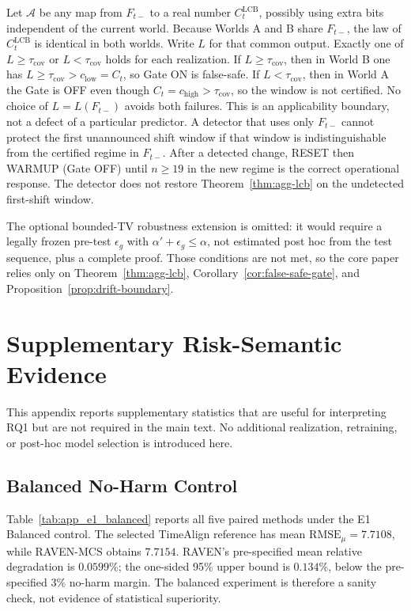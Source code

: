 Let $\mathcal{A}$ be any map from $F_{t-}$ to a real number
$C^{\mathrm{LCB}}_t$, possibly using extra bits independent of the current
world.  Because Worlds A and B share $F_{t-}$, the law of
$C^{\mathrm{LCB}}_t$ is identical in both worlds.  Write $L$ for that common
output.  Exactly one of $L\ge\tau_{\mathrm{cov}}$ or $L<\tau_{\mathrm{cov}}$
holds for each realization.  If $L\ge\tau_{\mathrm{cov}}$, then in World B one
has $L\ge\tau_{\mathrm{cov}}>c_{\mathrm{low}}=C_t$, so Gate ON is false-safe.
If $L<\tau_{\mathrm{cov}}$, then in World A the Gate is OFF even though
$C_t=c_{\mathrm{high}}>\tau_{\mathrm{cov}}$, so the window is not certified.
No choice of $L=L(F_{t-})$ avoids both failures.  This is an applicability
boundary, not a defect of a particular predictor.  A detector that uses only
$F_{t-}$ cannot protect the first unannounced shift window if that window is
indistinguishable from the certified regime in $F_{t-}$.  After a detected
change, RESET then WARMUP (Gate OFF) until $n\ge 19$ in the new regime is the
correct operational response.  The detector does not restore
Theorem~\ref{thm:agg-lcb} on the undetected first-shift window.

The optional bounded-TV robustness extension is omitted: it would require a
legally frozen pre-test $\epsilon_g$ with $\alpha'+\epsilon_g\le\alpha$, not
estimated post hoc from the test sequence, plus a complete proof.  Those
conditions are not met, so the core paper relies only on
Theorem~\ref{thm:agg-lcb}, Corollary~\ref{cor:false-safe-gate}, and
Proposition~\ref{prop:drift-boundary}.


\section{Supplementary Risk-Semantic Evidence}
\label{app:risk_semantic_evidence}

This appendix reports supplementary statistics that are useful for interpreting
RQ1 but are not required in the main text.  No additional realization,
retraining, or post-hoc model selection is introduced here.

\subsection{Balanced No-Harm Control}
\label{app:e1_balanced}

Table~\ref{tab:app_e1_balanced} reports all five paired methods under the E1
Balanced control.  The selected TimeAlign reference has mean
$\mathrm{RMSE}_\mu=7.7108$, while RAVEN-MCS obtains $7.7154$.  RAVEN's
pre-specified mean relative degradation is $0.0599\%$; the one-sided 95\%
upper bound is $0.134\%$, below the pre-specified $3\%$ no-harm margin.  The
balanced experiment is therefore a sanity check, not evidence of statistical
superiority.


